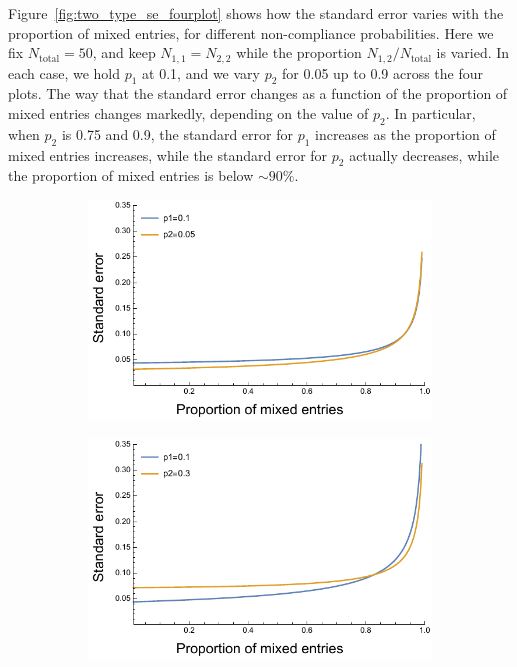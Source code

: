 \documentclass[aoas]{imsart}
\begin{document}
Figure~\ref{fig:two_type_se_fourplot} shows how the standard error varies with the proportion of mixed entries, for different non-compliance probabilities.  {Here we fix $N_\text{total}=50$, and keep $N_{1,1}=N_{2,2}$ while the proportion $N_{1,2}/N_\text{total}$ is varied.} In each case, we hold \(p_1\) at 0.1, and we vary \(p_2\) for 0.05 up to 0.9 across the four plots. The way that the standard error changes as a function of the proportion of mixed entries changes markedly, depending on the value of \(p_2\). In particular, when \(p_2\) is {0.75} and 0.9, the standard error for \(p_1\) increases as the proportion of mixed entries increases, while the standard error for \(p_2\) actually decreases, while the proportion of mixed entries is below \(\sim 90 \%\).



\begin{figure}[h]
\begin{subfigure}[b]{.49\textwidth}
\includegraphics[width=\textwidth]{../asymptotic_approximation/SE_twotype_p1_01_p2_005.pdf}
\end{subfigure}
\hfill
\begin{subfigure}[b]{0.49\textwidth}
\includegraphics[width=\textwidth]{../asymptotic_approximation/SE_twotype_p1_01_p2_03.pdf}

\end{subfigure}
\end{figure}
\end{document}
